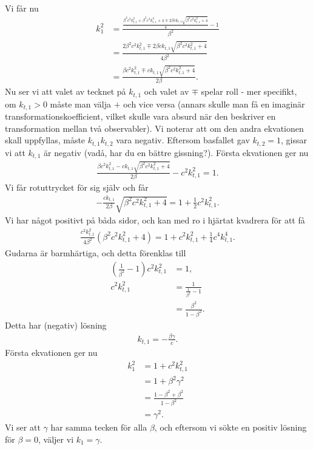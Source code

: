 Vi får nu
\begin{align*}
	k_{1}^{2} &= \frac{\frac{\beta^{2}c^{2}k_{t, 1}^{2} + \beta^{2}c^{2}k_{t, 1}^{2} + 4 \mp 2\beta ck_{t, 1}\sqrt{\beta^{2}c^{2}k_{t, 1}^{2} + 4}}{4} - 1}{\beta^{2}} \\
	          &= \frac{2\beta^{2}c^{2}k_{t, 1}^{2} \mp 2\beta ck_{t, 1}\sqrt{\beta^{2}c^{2}k_{t, 1}^{2} + 4}}{4\beta^{2}} \\
	          &= \frac{\beta c^{2}k_{t, 1}^{2} \mp ck_{t, 1}\sqrt{\beta^{2}c^{2}k_{t, 1}^{2} + 4}}{2\beta}.
\end{align*}
Nu ser vi att valet av tecknet på $k_{t, 1}$ och valet av $\mp$ spelar roll - mer specifikt, om $k_{t, 1} > 0$ måste man välja $+$ och vice versa (annars skulle man få en imaginär transformationskoefficient, vilket skulle vara absurd när den beskriver en transformation mellan två observabler). Vi noterar att om den andra ekvationen skall uppfyllas, måste $k_{t, 1}k_{t, 2}$ vara negativ. Eftersom basfallet gav $k_{t, 2} = 1$, gissar vi att $k_{t, 1}$ är negativ (vadå, har du en bättre gissning?). Första ekvationen ger nu
\begin{align*}
	\frac{\beta c^{2}k_{t, 1}^{2} - ck_{t, 1}\sqrt{\beta^{2}c^{2}k_{t, 1}^{2} + 4}}{2\beta} - c^{2}k_{t, 1}^{2} = 1.
\end{align*}
Vi får rotuttrycket för sig själv och får
\begin{align*}
	-\frac{ck_{t, 1}}{2\beta}\sqrt{\beta^{2}c^{2}k_{t, 1}^{2} + 4} = 1 + \frac{1}{2}c^{2}k_{t, 1}^{2}.
\end{align*}
Vi har något positivt på båda sidor, och kan med ro i hjärtat kvadrera för att få
\begin{align*}
	\frac{c^{2}k_{t, 1}^{2}}{4\beta^{2}}(\beta^{2}c^{2}k_{t, 1}^{2} + 4) = 1 + c^{2}k_{t, 1}^{2} + \frac{1}{4}c^{4}k_{t, 1}^{4}.
\end{align*}
Gudarna är barmhärtiga, och detta förenklas till
\begin{align*}
	\left(\frac{1}{\beta^{2}} - 1\right)c^{2}k_{t, 1}^{2} &= 1, \\
	c^{2}k_{t, 1}^{2}                                     &= \frac{1}{\frac{1}{\beta^{2}} - 1} \\
	                                                      &= \frac{\beta^{2}}{1 - \beta^{2}}.
\end{align*}
Detta har (negativ) lösning
\begin{align*}
	k_{t, 1} = -\frac{\beta\gamma}{c}.
\end{align*}
Första ekvationen ger nu
\begin{align*}
	k_{1}^{2} &= 1 + c^{2}k_{t, 1}^{2} \\
	          &= 1 + \beta^{2}\gamma^{2} \\
	          &= \frac{1 - \beta^{2} + \beta^{2}}{1 - \beta^{2}} \\
	          &= \gamma^{2}.
\end{align*}
Vi ser att $\gamma$ har samma tecken för alla $\beta$, och eftersom vi sökte en positiv lösning för $\beta = 0$, väljer vi $k_{1} = \gamma$.

